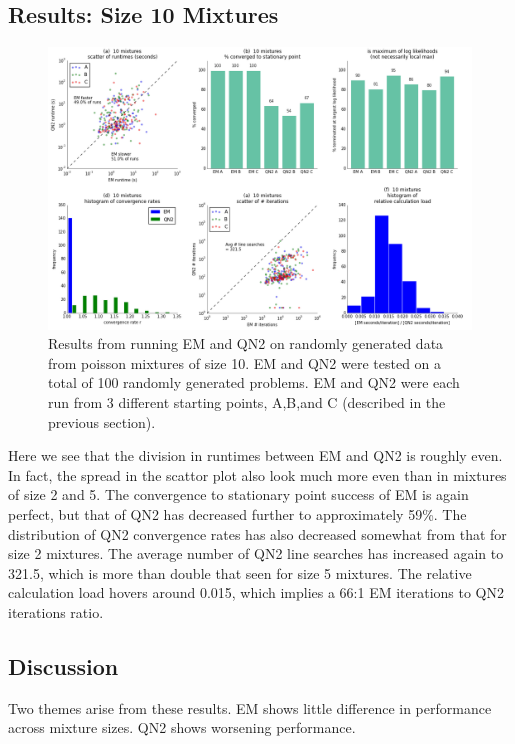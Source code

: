\documentclass[letter,12pt]{article}
\begin{document}
\subsection{Results:  Size 10 Mixtures}
\begin{figure}[h]
\centering
\includegraphics[width=16cm]{fig_RunData2_K10_init3.png}
\caption{Results from running EM and QN2 on randomly generated data from poisson mixtures of size 10.  EM and QN2 were tested on a total of 100 randomly generated problems.  EM and QN2 were each run from 3 different starting points, A,B,and C (described in the previous section).}
\end{figure}

Here we see that the division in runtimes between EM and QN2 is roughly even.  In fact, the spread in the scattor plot also look much more even than in mixtures of size 2 and 5.  The convergence to stationary point success of EM is again perfect, but that of QN2 has decreased further to approximately 59\%.  The distribution of QN2 convergence rates has also decreased somewhat from that for size 2 mixtures.  The average number of QN2 line searches has increased again to 321.5, which is more than double that seen for size 5 mixtures.  The relative calculation load hovers around 0.015, which implies a 66:1 EM iterations to QN2 iterations ratio.

\subsection{Discussion}

Two themes arise from these results.  EM shows little difference in performance across mixture sizes.  QN2 shows worsening performance.
\end{document}
